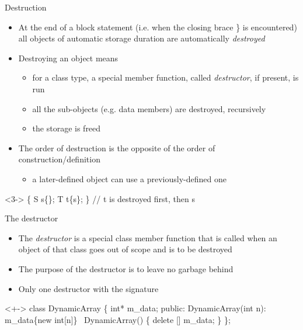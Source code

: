 \begin{frame}[fragile]{Destruction}

  \begin{itemize}
  \item<1-> At the end of a block statement (i.e. when the closing brace
    \alert{\}} is encountered) all objects of automatic storage duration are
    automatically \textit{destroyed}
  \item<2-> Destroying an object means
    \begin{itemize}
    \item for a class type, a special member function, called
      \textit{destructor}, if present, is run
    \item all the sub-objects (e.g. data members) are destroyed, recursively
    \item the storage is freed
    \end{itemize}
  \item<3-> The order of destruction is the opposite of the order of
    construction/definition
    \begin{itemize}
    \item a later-defined object can use a previously-defined one
    \end{itemize}
  \end{itemize}

  \begin{codeblock}<3->{
\{
  S s\{\ddd\};
  \ddd
  T t\{s\};
  \ddd
\} // t is destroyed first, then s}\end{codeblock}

\end{frame}

\begin{frame}[fragile]{The destructor}

  \begin{itemize}[<+->]
  \item The \textit{destructor} is a special class member function that is
    called when an object of that class goes out of scope and is to be destroyed
  \item The purpose of the destructor is to leave no garbage behind
  \item Only one destructor with the signature 
  \end{itemize}

  \begin{codeblock}<+->
class DynamicArray \{
  \ddd
  int* m_data;
 public:
  DynamicArray(int n): m_data\{new int[n]\} \ddd
  ~DynamicArray()
  \{
    delete [] m_data;
  \}
\};\end{codeblock}

\end{frame}

